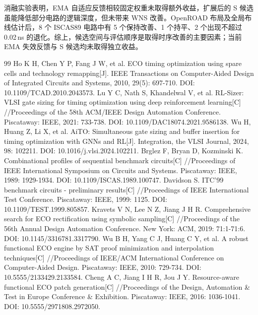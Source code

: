 \documentclass[twocolumn,10pt,fontset=windows]{ctexart}
\begin{document}
消融实验表明，EMA 自适应反馈相较固定权重未取得额外收益，扩展后的 S 候选虽能降低部分电路的逻辑深度，但未带来 WNS 改善。OpenROAD 布局及全局布线估计后，8 个 ISCAS89 电路中有 5 个保持改善、1 个持平、2 个出现不超过 0.02\,ns 的退化。综上，候选空间与评估顺序是取得时序改善的主要因素；当前 EMA 失效反馈与 S 候选均未取得独立收益。




\renewcommand{\refname}{参考文献}
\footnotesize
\linespread{0.95}\selectfont
\balance
\begin{thebibliography}{99}
 Ho K H, Chen Y P, Fang J W, et al. ECO timing optimization using spare cells and technology remapping[J]. IEEE Transactions on Computer-Aided Design of Integrated Circuits and Systems, 2010, 29(5): 697-710. DOI: 10.1109/TCAD.2010.2043573.
 Lu Y C, Nath S, Khandelwal V, et al. RL-Sizer: VLSI gate sizing for timing optimization using deep reinforcement learning[C] //Proceedings of the 58th ACM/IEEE Design Automation Conference. Piscataway: IEEE, 2021: 733-738. DOI: 10.1109/DAC18074.2021.9586138.
 Wu H, Huang Z, Li X, et al. AiTO: Simultaneous gate sizing and buffer insertion for timing optimization with GNNs and RL[J]. Integration, the VLSI Journal, 2024, 98: 102211. DOI: 10.1016/j.vlsi.2024.102211.
 Brglez F, Bryan D, Kozminski K. Combinational profiles of sequential benchmark circuits[C] //Proceedings of IEEE International Symposium on Circuits and Systems. Piscataway: IEEE, 1989: 1929-1934. DOI: 10.1109/ISCAS.1989.100747.
 Davidson S. ITC'99 benchmark circuits - preliminary results[C] //Proceedings of IEEE International Test Conference. Piscataway: IEEE, 1999: 1125. DOI: 10.1109/TEST.1999.805857.
 Kravets V N, Lee N Z, Jiang J H R. Comprehensive search for ECO rectification using symbolic sampling[C] //Proceedings of the 56th Annual Design Automation Conference. New York: ACM, 2019: 71:1-71:6. DOI: 10.1145/3316781.3317790.
 Wu B H, Yang C J, Huang C Y, et al. A robust functional ECO engine by SAT proof minimization and interpolation techniques[C] //Proceedings of IEEE/ACM International Conference on Computer-Aided Design. Piscataway: IEEE, 2010: 729-734. DOI: 10.5555/2133429.2133584.
 Cheng A C, Jiang I H R, Jou J Y. Resource-aware functional ECO patch generation[C] //Proceedings of the Design, Automation \& Test in Europe Conference \& Exhibition. Piscataway: IEEE, 2016: 1036-1041. DOI: 10.5555/2971808.2972050.

\end{thebibliography}
\end{document}
